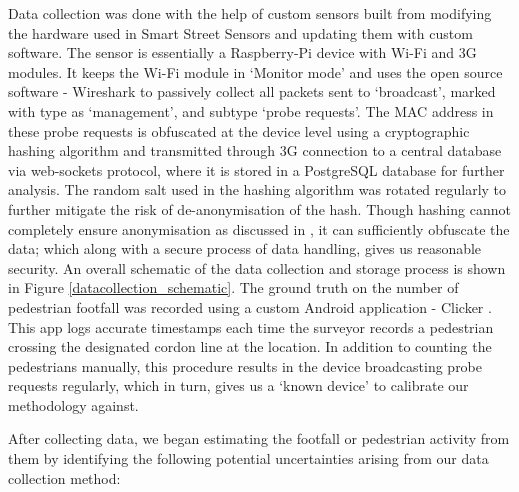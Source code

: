 Data collection was done with the help of custom sensors built from modifying the hardware used in Smart Street Sensors \citep{sss2016} and updating them with custom software.
The sensor is essentially a Raspberry-Pi device with Wi-Fi and 3G modules.
It keeps the Wi-Fi module in `Monitor mode' and uses the open source software - Wireshark \citep{wireshark2} to passively collect all packets sent to `broadcast', marked with type as `management', and subtype `probe requests'.
The MAC address in these probe requests is obfuscated at the device level using a cryptographic hashing algorithm and transmitted through 3G connection to a central database via web-sockets protocol, where it is stored in a PostgreSQL database for further analysis.
The random salt used in the hashing algorithm was rotated regularly to further mitigate the risk of de-anonymisation of the hash.
Though hashing cannot completely ensure anonymisation as discussed in \citep{demir2014}, it can sufficiently obfuscate the data; which along with a secure process of data handling, gives us reasonable security.
An overall schematic of the data collection and storage process is shown in Figure \ref{datacollection_schematic}.
The ground truth on the number of pedestrian footfall was recorded using a custom Android application - Clicker \citep{bala2018}.
This app logs accurate timestamps each time the surveyor records a pedestrian crossing the designated cordon line at the location.
In addition to counting the pedestrians manually, this procedure results in the device broadcasting probe requests regularly, which in turn, gives us a `known device' to calibrate our methodology against.



After collecting data, we began estimating the footfall or pedestrian activity from them by identifying the following potential uncertainties arising from our data collection method:

